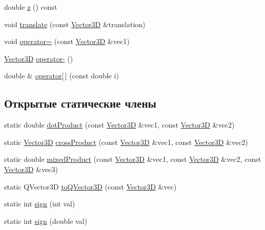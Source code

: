 \begin{DoxyCompactItemize}
\item 
double \mbox{\hyperlink{class_vector3_d_af4ae427e82a23af845f804106daed509}{z}} () const
\item 
void \mbox{\hyperlink{class_vector3_d_acc864b8a5dbf26d7a5be215618c1108f}{translate}} (const \mbox{\hyperlink{class_vector3_d}{Vector3D}} \&translation)
\item 
void \mbox{\hyperlink{class_vector3_d_a16ee6c0c6055de6015e06aa6987bde71}{operator=}} (const \mbox{\hyperlink{class_vector3_d}{Vector3D}} \&vec1)
\item 
\mbox{\hyperlink{class_vector3_d}{Vector3D}} \mbox{\hyperlink{class_vector3_d_a4b3dc84bd0535b0dabda0571928d47f0}{operator-\/}} ()
\item 
double \& \mbox{\hyperlink{class_vector3_d_a9f879580bde4ca8b893df5f427c0729d}{operator\mbox{[}$\,$\mbox{]}}} (const double i)
\end{DoxyCompactItemize}
\subsection*{Открытые статические члены}
\begin{DoxyCompactItemize}
\item 
static double \mbox{\hyperlink{class_vector3_d_ac886e5b1f67b986be8c9557e83e19c52}{dot\+Product}} (const \mbox{\hyperlink{class_vector3_d}{Vector3D}} \&vec1, const \mbox{\hyperlink{class_vector3_d}{Vector3D}} \&vec2)
\item 
static \mbox{\hyperlink{class_vector3_d}{Vector3D}} \mbox{\hyperlink{class_vector3_d_af285c3999c9bd477c0dff411f05c7902}{cross\+Product}} (const \mbox{\hyperlink{class_vector3_d}{Vector3D}} \&vec1, const \mbox{\hyperlink{class_vector3_d}{Vector3D}} \&vec2)
\item 
static double \mbox{\hyperlink{class_vector3_d_ac9fc2d629f5edaf274bbcc767804c5ff}{mixed\+Product}} (const \mbox{\hyperlink{class_vector3_d}{Vector3D}} \&vec1, const \mbox{\hyperlink{class_vector3_d}{Vector3D}} \&vec2, const \mbox{\hyperlink{class_vector3_d}{Vector3D}} \&vec3)
\item 
static Q\+Vector3D \mbox{\hyperlink{class_vector3_d_a049b8308f9e44f6d1ef0cd053dd68e58}{to\+Q\+Vector3D}} (const \mbox{\hyperlink{class_vector3_d}{Vector3D}} \&vec)
\item 
static int \mbox{\hyperlink{class_vector3_d_a33ed676fd6cbba492295d9cadf5df496}{sign}} (int val)
\item 
static int \mbox{\hyperlink{class_vector3_d_a7572a5234eaf68003be04b2677d8f7a3}{sign}} (double val)
\end{DoxyCompactItemize}
